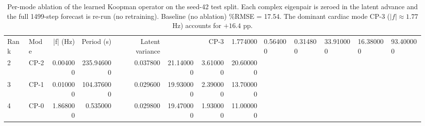 \begin{table}
\caption{Per-mode ablation of the learned Koopman operator on the seed-42 test split. Each complex eigenpair is zeroed in the latent advance and the full 1499-step forecast is re-run (no retraining). Baseline (no ablation) \%RMSE = 17.54. The dominant cardiac mode CP-3 ($|f|\approx1.77$ Hz) accounts for $+16.4$ pp.}
\label{tab:mode_ablation}
\begin{tabular}{llrrrrrr}
\toprule
Rank & Mode & |f| (Hz) & Period (s) & Latent variance & %
 & CP-3 & 1.774000 & 0.564000 & 0.314800 & 33.910000 & 16.380000 & 93.400000 \\
2 & CP-2 & 0.004000 & 235.946000 & 0.037800 & 21.140000 & 3.610000 & 20.600000 \\
3 & CP-1 & 0.010000 & 104.376000 & 0.029600 & 19.930000 & 2.390000 & 13.700000 \\
4 & CP-0 & 1.868000 & 0.535000 & 0.029800 & 19.470000 & 1.930000 & 11.000000 \\
\bottomrule
\end{tabular}
\end{table}
